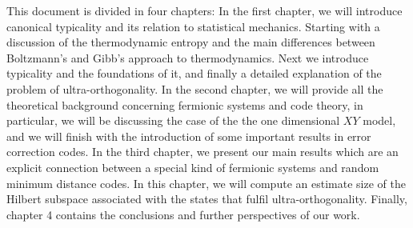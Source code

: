 


\indent This document is divided in four chapters: In the first chapter, we will introduce canonical typicality and its relation to statistical mechanics. Starting with a discussion of the thermodynamic entropy and the main differences between Boltzmann's  and Gibb's approach to thermodynamics. Next we introduce typicality and the foundations of it, and finally a detailed explanation of the problem of ultra-orthogonality. In the second chapter, we will provide all the theoretical background concerning fermionic systems and code theory, in particular, we will be discussing the case of the the one dimensional $XY$ model, and we will finish with the introduction of some important results in error correction codes. In the third chapter, we present our main results which are an explicit connection between a special kind of fermionic systems and random minimum distance codes. In this chapter, we will compute an estimate size of the Hilbert subspace associated with the states that fulfil ultra-orthogonality. Finally, chapter 4 contains the conclusions and further perspectives of our work.


